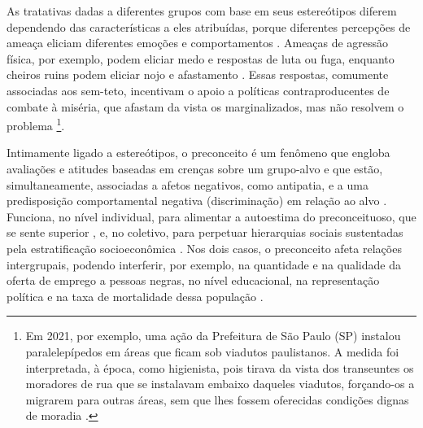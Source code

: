 \documentclass[portuguese]{textolivre}
\begin{document}
As tratativas dadas a diferentes grupos com base em seus estereótipos diferem dependendo das características a eles atribuídas, porque diferentes percepções de ameaça eliciam diferentes emoções e comportamentos \cite{neuberg2015}. Ameaças de agressão física, por exemplo, podem eliciar medo e respostas de luta ou fuga, enquanto cheiros ruins podem eliciar nojo e afastamento \cite{neuberg2015}. Essas respostas, comumente associadas aos sem-teto, incentivam o apoio a políticas contraproducentes de combate à miséria, que afastam da vista os marginalizados, mas não resolvem o problema \cite{clifford2017}\footnote{Em 2021, por exemplo, uma ação da Prefeitura de São Paulo (SP) instalou paralelepípedos em áreas que ficam sob viadutos paulistanos. A medida foi interpretada, à época, como higienista, pois tirava da vista dos transeuntes os moradores de rua que se instalavam embaixo daqueles viadutos, forçando-os a migrarem para outras áreas, sem que lhes fossem oferecidas condições dignas de moradia \cite{g1sp}.}.

Intimamente ligado a estereótipos, o preconceito é um fenômeno que engloba avaliações e atitudes baseadas em crenças sobre um grupo-alvo e que estão, simultaneamente, associadas a afetos negativos, como antipatia, e a uma predisposição comportamental negativa (discriminação) em relação ao alvo \cite{dovidio2010}. Funciona, no nível individual, para alimentar a autoestima do preconceituoso, que se sente superior \cite{fein1997prejudice}, e, no coletivo, para perpetuar hierarquias sociais sustentadas pela estratificação socioeconômica \cite{bobo1999prejudice}. Nos dois casos, o preconceito afeta relações intergrupais, podendo interferir, por exemplo, na quantidade e na qualidade da oferta de emprego a pessoas negras, no nível educacional, na representação política e na taxa de mortalidade dessa população \cite{ibge2019}.
\end{document}
